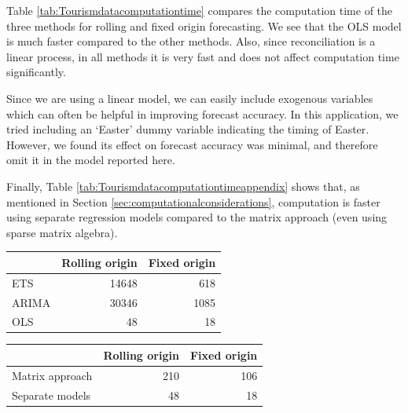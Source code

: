 \documentclass[11pt,a4paper,]{article}
\let\origtable\table
\let\endorigtable\endtable
\renewenvironment{table}[1][2] {
    \expandafter\origtable\expandafter[!htbp]
} {
    \endorigtable
}
\begin{document}
Table \ref{tab:Tourismdatacomputationtime} compares the computation time of the three methods for rolling and fixed origin forecasting. We see that the OLS model is much faster compared to the other methods. Also, since reconciliation is a linear process, in all methods it is very fast and does not affect computation time significantly.

Since we are using a linear model, we can easily include exogenous variables which can often be helpful in improving forecast accuracy. In this application, we tried including an `Easter' dummy variable indicating the timing of Easter. However, we found its effect on forecast accuracy was minimal, and therefore omit it in the model reported here.

Finally, Table \ref{tab:Tourismdatacomputationtimeappendix} shows that, as mentioned in Section \ref{sec:computationalconsiderations}, computation is faster using separate regression models compared to the matrix approach (even using sparse matrix algebra).

\begin{table}

\caption{\label{tab:Tourismdatacomputationtime}Computation time (seconds) for OLS using the matrix approach and separate regression models, with reconciliation, for rolling and fixed origin, on a 24 months test set.}
\centering
\begin{tabular}[t]{lrr}
\toprule
 & Rolling origin & Fixed origin\\
\midrule
ETS & 14648 & 618\\
ARIMA & 30346 & 1085\\
OLS & 48 & 18\\
\bottomrule
\end{tabular}
\end{table}

\begin{table}

\caption{\label{tab:Tourismdatacomputationtimeappendix}Computation time (seconds) for OLS using the matrix approach and separate regression models, with reconciliation, for rolling and fixed origin, on a 24 months test set.}
\centering
\begin{tabular}[t]{lrr}
\toprule
 & Rolling origin & Fixed origin\\
\midrule
Matrix approach & 210 & 106\\
Separate models & 48 & 18\\
\bottomrule
\end{tabular}
\end{table}
\end{document}
